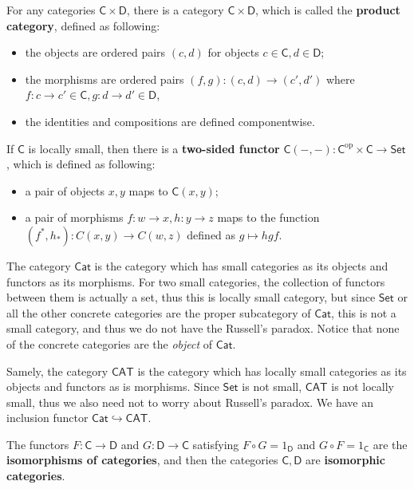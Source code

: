 \begin{defn} For any categories $\mathsf{C}\times \mathsf{D}$, there is a category $\mathsf{C}\times \mathsf{D}$, which is called the \textbf{product category}, defined as following:
\begin{itemize}
\item the objects are ordered pairs $(c,d)$ for objects $c\in \mathsf{C},d\in \mathsf{D}$;
\item the morphisms are ordered pairs $(f,g):(c,d)\rightarrow (c',d')$ where $f:c\rightarrow c'\in \mathsf{C}, g:d\rightarrow d'\in\mathsf{D}$,
\item the identities and compositions are defined componentwise.
\end{itemize}
\end{defn}
\begin{defn} If $\mathsf{C}$ is locally small, then there is a \textbf{two-sided functor} $\mathsf{C}(-,-):\mathsf{C}^{\mathrm{op}}\times \mathsf{C}\rightarrow \mathsf{Set}$, which is defined as following:
\begin{itemize}
\item a pair of objects $x,y$ maps to $\mathsf{C}(x,y)$;
\item a pair of morphisms $f:w\rightarrow x, h:y\rightarrow z$ maps to the function $(f^*,h_*):C(x,y)\rightarrow C(w,z)$ defined as $g\mapsto hgf$.
\end{itemize}
\end{defn}

\begin{defn}The category $\mathsf{Cat}$ is the category which has small categories as its objects and functors as its morphisms. For two small categories, the collection of functors between them is actually a set, thus this is locally small category, but since $\mathsf{Set}$ or all the other concrete categories are the proper subcategory of $\mathsf{Cat}$, this is not a small category, and thus we do not have the Russell's paradox. Notice that none of the concrete categories are the \textit{object} of $\mathsf{Cat}$.

Samely, the category $\mathsf{CAT}$ is the category which has locally small categories as its objects and functors as is morphisms. Since $\mathsf{Set}$ is not small, $\mathsf{CAT}$ is not locally small, thus we also need not to worry about Russell's paradox. We have an inclusion functor $\mathsf{Cat}\hookrightarrow \mathsf{CAT}$.
\end{defn}

\begin{defn}
The functors $F:\mathsf{C}\rightarrow \mathsf{D}$ and $G:\mathsf{D}\rightarrow \mathsf{C}$ satisfying $F\circ G=1_{\mathsf{D}}$ and $G\circ F=1_{\mathsf{C}}$ are the \textbf{isomorphisms of categories}, and then the categories $\mathsf{C},\mathsf{D}$ are \textbf{isomorphic categories}.
\end{defn}

